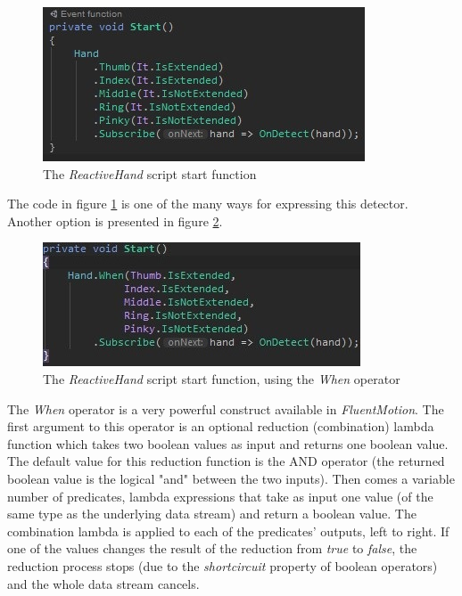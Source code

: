 \documentclass[12pt,a4paper,twoside]{report}
\begin{document}
\begin{figure}[h]
  \centering
  \includegraphics[width=0.9\linewidth]{img/FluentMotion_script.jpg}
  \caption{The \textit{ReactiveHand} script start function}
  \label{fig:fm_rh_start}
\end{figure}

The code in figure \ref{fig:fm_rh_start} is one of the many ways for expressing this detector. Another option is presented in figure \ref{fig:fm_when}.

\begin{figure}[h]
  \centering
  \includegraphics[width=0.9\linewidth]{img/FluentMotion_script_alternative.jpg}
  \caption{The \textit{ReactiveHand} script start function, using the \textit{When} operator}
  \label{fig:fm_when}
\end{figure}

The \textit{When} operator is a very powerful construct available in \textit{FluentMotion}. The first argument to this operator is an optional reduction (combination) lambda function which takes two boolean values as input and returns one boolean value. The default value for this reduction function is the AND operator (the returned boolean value is the logical "and" between the two inputs). Then comes a variable number of predicates, lambda expressions that take as input one value (of the same type as the underlying data stream) and return a boolean value. The combination lambda is applied to each of the predicates' outputs, left to right. If one of the values changes the result of the reduction from \textit{true} to \textit{false}, the reduction process stops (due to the \textit{shortcircuit} property of boolean operators) and the whole data stream cancels.
\end{document}
